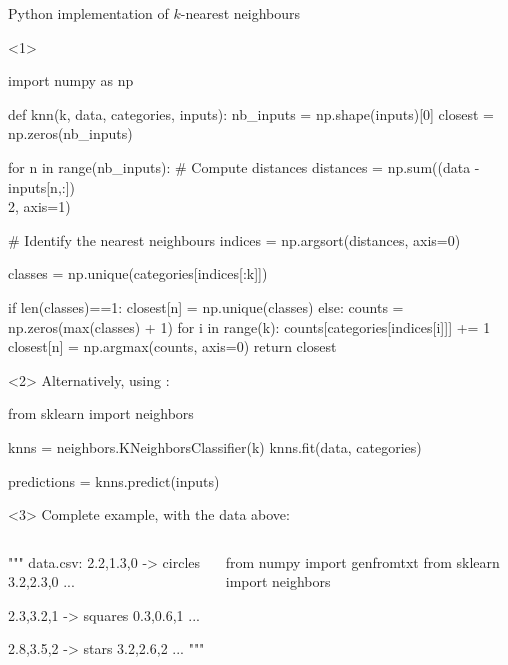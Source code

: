 \documentclass[compress]{beamer}
\begin{document}
\begin{frame}[fragile]{Python implementation of $k$-nearest neighbours}

\begin{onlyenv}<1>
\begin{pythoncode}
import numpy as np

def knn(k, data, categories, inputs):
  nb_inputs = np.shape(inputs)[0]
  closest = np.zeros(nb_inputs)

  for n in range(nb_inputs):
    # Compute distances
    distances = np.sum((data - inputs[n,:])\\2, axis=1)
    
    # Identify the nearest neighbours
    indices = np.argsort(distances, axis=0)

    classes = np.unique(categories[indices[:k]])
    
    if len(classes)==1:
        closest[n] = np.unique(classes)
    else:
        counts = np.zeros(max(classes) + 1)
        for i in range(k):
            counts[categories[indices[i]]] += 1
        closest[n] = np.argmax(counts, axis=0)
  return closest
\end{pythoncode}
\end{onlyenv}

\begin{onlyenv}<2>
    Alternatively, using :

\begin{pythoncode}
from sklearn import neighbors

knns = neighbors.KNeighborsClassifier(k)
knns.fit(data, categories)

predictions = knns.predict(inputs)
\end{pythoncode}

\end{onlyenv}

\begin{onlyenv}<3>
    Complete example, with the data above:

\begin{columns}
    \begin{column}{0.4\linewidth}
\begin{pythoncode}
""" data.csv:
2.2,1.3,0 -> circles
3.2,2.3,0
...

2.3,3.2,1 -> squares
0.3,0.6,1
...

2.8,3.5,2 -> stars
3.2,2.6,2
...
"""
\end{pythoncode}
        
    \end{column}
    \begin{column}{0.6\linewidth}
\begin{pythoncode}
from numpy import genfromtxt
from sklearn import neighbors


\end{pythoncode}
\end{column}
\end{columns}
\end{onlyenv}
\end{frame}
\end{document}
